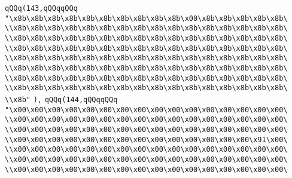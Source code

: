 \verb|qQQq(143,qQQqqQQq|\newline
\verb|"\x8b\x8b\x8b\x8b\x8b\x8b\x8b\x8b\x8b\x8b\x00\x8b\x8b\x8b\x8b\x8b\|\newline
\verb|\\x8b\x8b\x8b\x8b\x8b\x8b\x8b\x8b\x8b\x8b\x8b\x8b\x8b\x8b\x8b\x8b\|\newline
\verb|\\x8b\x8b\x8b\x8b\x8b\x8b\x8b\x8b\x8b\x8b\x8b\x8b\x8b\x8b\x8b\x8b\|\newline
\verb|\\x8b\x8b\x8b\x8b\x8b\x8b\x8b\x8b\x8b\x8b\x8b\x8b\x8b\x8b\x8b\x8b\|\newline
\verb|\\x8b\x8b\x8b\x8b\x8b\x8b\x8b\x8b\x8b\x8b\x8b\x8b\x8b\x8b\x8b\x8b\|\newline
\verb|\\x8b\x8b\x8b\x8b\x8b\x8b\x8b\x8b\x8b\x8b\x8b\x8b\x8b\x8b\x8b\x8b\|\newline
\verb|\\x8b\x8b\x8b\x8b\x8b\x8b\x8b\x8b\x8b\x8b\x8b\x8b\x8b\x8b\x8b\x8b\|\newline
\verb|\\x8b\x8b\x8b\x8b\x8b\x8b\x8b\x8b\x8b\x8b\x8b\x8b\x8b\x8b\x8b\x8b\|\newline
\verb|\\x8b"|\newline
\verb|),|\newline
\verb|qQQq(144,qQQqqQQq|\newline
\verb|"\x00\x00\x00\x00\x00\x00\x00\x00\x00\x00\x00\x00\x00\x00\x00\x00\|\newline
\verb|\\x00\x00\x00\x00\x00\x00\x00\x00\x00\x00\x00\x00\x00\x00\x00\x00\|\newline
\verb|\\x00\x00\x00\x00\x00\x00\x00\x00\x00\x00\x00\x00\x00\x00\x00\x00\|\newline
\verb|\\x00\x00\x00\x00\x00\x00\x00\x00\x00\x00\x00\x00\x00\x00\x91\x00\|\newline
\verb|\\x00\x00\x00\x00\x00\x00\x00\x00\x00\x00\x00\x00\x00\x00\x00\x00\|\newline
\verb|\\x00\x00\x00\x00\x00\x00\x00\x00\x00\x00\x00\x00\x00\x00\x00\x00\|\newline
\verb|\\x00\x00\x00\x00\x00\x00\x00\x00\x00\x00\x00\x00\x00\x00\x00\x00\|\newline
